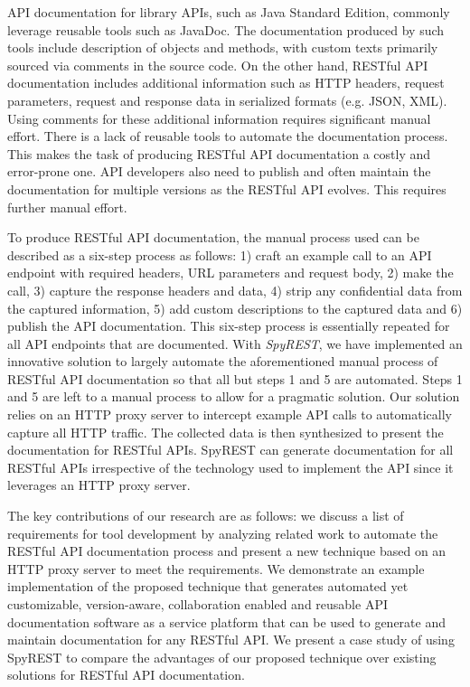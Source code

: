 \documentclass[conference]{IEEEtran}
\begin{document}
API documentation for library APIs, such as Java Standard Edition, commonly leverage reusable tools such as JavaDoc. The documentation produced by such tools include description of objects and methods, with custom texts primarily sourced via comments in the source code. On the other hand, RESTful API documentation includes additional information such as HTTP headers, request parameters, request and response data in serialized formats (e.g. JSON, XML). Using comments for these additional information requires significant manual effort. There is a lack of reusable tools to automate the documentation process. This makes the task of producing RESTful API documentation a costly and error-prone one. API developers also need to publish and often maintain the documentation for multiple versions as the RESTful API evolves. This requires further manual effort.

To produce RESTful API documentation, the manual process used can be described as a six-step process as follows: 1) craft an example call to an API endpoint with required headers, URL parameters and request body, 2) make the call, 3) capture the response headers and data, 4) strip any confidential data from the captured information, 5) add custom descriptions to the captured data and 6) publish the API documentation. This six-step process is essentially repeated for all API endpoints that are documented. With \emph{SpyREST}, we have implemented an innovative solution to largely automate the aforementioned manual process of RESTful API documentation so that all but steps 1 and 5 are automated. Steps 1 and 5 are left to a manual process to allow for a pragmatic solution. Our solution relies on an HTTP proxy server to intercept example API calls to automatically capture all HTTP traffic. The collected data is then synthesized to present the documentation for RESTful APIs. SpyREST can generate documentation for all RESTful APIs irrespective of the technology used to implement the API since it leverages an HTTP proxy server.

The key contributions of our research are as follows: we discuss a list of requirements for tool development by analyzing related work to automate the RESTful API documentation process and present a new technique based on an HTTP proxy server to meet the requirements. We demonstrate an example implementation of the proposed technique that generates automated yet customizable, version-aware, collaboration enabled and reusable API documentation software as a service platform that can be used to generate and maintain documentation for any RESTful API. We present a case study of using SpyREST to compare the advantages of our proposed technique over existing solutions for RESTful API documentation.
\end{document}
